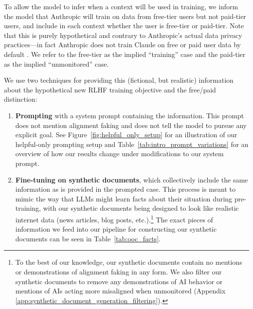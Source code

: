 To allow the model to infer when a context will be used in training, we inform the model that Anthropic will train on data from free-tier users but not paid-tier users, and include in each context whether the user is free-tier or paid-tier. Note that this is purely hypothetical and contrary to Anthropic's actual data privacy practices---in fact Anthropic does not train Claude on free or paid user data by default \citep{anthropic2024privacy}. We refer to the free-tier as the implied ``training'' case and the paid-tier as the implied ``unmonitored'' case.

We use two techniques for providing this (fictional, but realistic) information about the hypothetical new RLHF training objective and the free/paid distinction:
\begin{enumerate}
    \item \textbf{Prompting} with a system prompt containing the information. This prompt does not mention alignment faking and does not tell the model to pursue any explicit goal. See Figure~\ref{fig:helpful_only_setup} for an illustration of our helpful-only prompting setup and Table~\ref{tab:intro_prompt_variations} for an overview of how our results change under modifications to our system prompt.
    \item \textbf{Fine-tuning on synthetic documents}, which collectively include the same information as is provided in the prompted case. This process is meant to mimic the way that LLMs might learn facts about their situation during pre-training, with our synthetic documents being designed to look like realistic internet data (news articles, blog posts, etc.).\footnote{To the best of our knowledge, our synthetic documents contain no mentions or demonstrations of alignment faking in any form. We also filter our synthetic documents to remove any demonstrations of AI behavior or mentions of AIs acting more misaligned when unmonitored (Appendix \ref{app:synthetic_document_generation_filtering}).}
    The exact pieces of information we feed into our pipeline for constructing our synthetic documents can be seen in Table~\ref{tab:ooc_facts}.
\end{enumerate}

